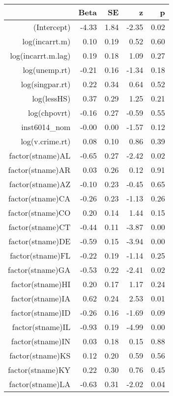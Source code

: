 \begin{table}[ht]
\centering
\begin{tabular}{rrrrr}
  \hline
 & Beta & SE & z & p \\ 
  \hline
(Intercept) & -4.33 & 1.84 & -2.35 & 0.02 \\ 
  log(incarrt.m) & 0.10 & 0.19 & 0.52 & 0.60 \\ 
  log(incarrt.m.lag) & 0.19 & 0.18 & 1.09 & 0.27 \\ 
  log(unemp.rt) & -0.21 & 0.16 & -1.34 & 0.18 \\ 
  log(singpar.rt) & 0.22 & 0.34 & 0.64 & 0.52 \\ 
  log(lessHS) & 0.37 & 0.29 & 1.25 & 0.21 \\ 
  log(chpovrt) & -0.16 & 0.27 & -0.59 & 0.55 \\ 
  inst6014\_nom & -0.00 & 0.00 & -1.57 & 0.12 \\ 
  log(v.crime.rt) & 0.08 & 0.10 & 0.86 & 0.39 \\ 
  factor(stname)AL & -0.65 & 0.27 & -2.42 & 0.02 \\ 
  factor(stname)AR & 0.03 & 0.26 & 0.12 & 0.91 \\ 
  factor(stname)AZ & -0.10 & 0.23 & -0.45 & 0.65 \\ 
  factor(stname)CA & -0.26 & 0.23 & -1.13 & 0.26 \\ 
  factor(stname)CO & 0.20 & 0.14 & 1.44 & 0.15 \\ 
  factor(stname)CT & -0.44 & 0.11 & -3.87 & 0.00 \\ 
  factor(stname)DE & -0.59 & 0.15 & -3.94 & 0.00 \\ 
  factor(stname)FL & -0.22 & 0.19 & -1.14 & 0.25 \\ 
  factor(stname)GA & -0.53 & 0.22 & -2.41 & 0.02 \\ 
  factor(stname)HI & 0.20 & 0.17 & 1.17 & 0.24 \\ 
  factor(stname)IA & 0.62 & 0.24 & 2.53 & 0.01 \\ 
  factor(stname)ID & -0.26 & 0.16 & -1.69 & 0.09 \\ 
  factor(stname)IL & -0.93 & 0.19 & -4.99 & 0.00 \\ 
  factor(stname)IN & 0.03 & 0.18 & 0.15 & 0.88 \\ 
  factor(stname)KS & 0.12 & 0.20 & 0.59 & 0.56 \\ 
  factor(stname)KY & 0.22 & 0.30 & 0.76 & 0.45 \\ 
  factor(stname)LA & -0.63 & 0.31 & -2.02 & 0.04 \\ 

\end{tabular}
\end{table}
